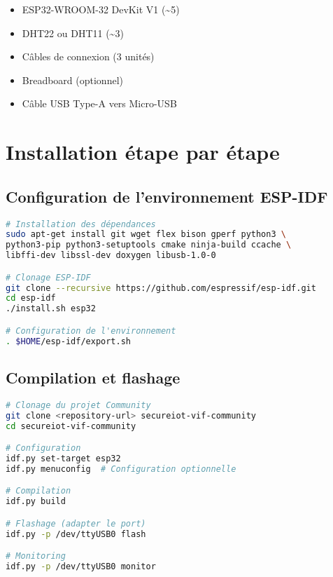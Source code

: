 \begin{itemize}
    \item ESP32-WROOM-32 DevKit V1 (\textasciitilde 5\textdollar)
    \item DHT22 ou DHT11 (\textasciitilde 3\textdollar)
    \item Câbles de connexion (3 unités)
    \item Breadboard (optionnel)
    \item Câble USB Type-A vers Micro-USB
\end{itemize}

\section{Installation étape par étape}

\subsection{Configuration de l'environnement ESP-IDF}

\begin{lstlisting}[language=bash, caption=Installation ESP-IDF Linux]
# Installation des dépendances
sudo apt-get install git wget flex bison gperf python3 \
python3-pip python3-setuptools cmake ninja-build ccache \
libffi-dev libssl-dev doxygen libusb-1.0-0

# Clonage ESP-IDF
git clone --recursive https://github.com/espressif/esp-idf.git
cd esp-idf
./install.sh esp32

# Configuration de l'environnement
. $HOME/esp-idf/export.sh
\end{lstlisting}

\subsection{Compilation et flashage}

\begin{lstlisting}[language=bash, caption=Compilation du projet]
# Clonage du projet Community
git clone <repository-url> secureiot-vif-community
cd secureiot-vif-community

# Configuration
idf.py set-target esp32
idf.py menuconfig  # Configuration optionnelle

# Compilation
idf.py build

# Flashage (adapter le port)
idf.py -p /dev/ttyUSB0 flash

# Monitoring
idf.py -p /dev/ttyUSB0 monitor
\end{lstlisting}

